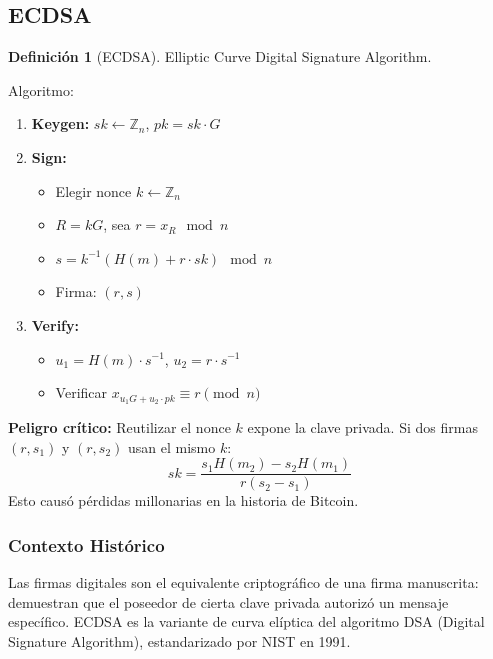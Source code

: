 \documentclass[11pt,a4paper,twoside,openright]{book}
\theoremstyle{definition}
\newtheorem{definition}{Definición}[chapter]
\theoremstyle{plain}
\theoremstyle{remark}
\newcommand{\Z}{\mathbb{Z}}
\begin{document}

\subsection{ECDSA}

\begin{definition}[ECDSA]
Elliptic Curve Digital Signature Algorithm.
\end{definition}

Algoritmo:
\begin{enumerate}
    \item \textbf{Keygen:} $sk \leftarrow \Z_n$, $pk = sk \cdot G$
    \item \textbf{Sign:}
    \begin{itemize}
        \item Elegir nonce $k \leftarrow \Z_n$
        \item $R = kG$, sea $r = x_R \mod n$
        \item $s = k^{-1}(H(m) + r \cdot sk) \mod n$
        \item Firma: $(r, s)$
    \end{itemize}
    \item \textbf{Verify:}
    \begin{itemize}
        \item $u_1 = H(m) \cdot s^{-1}$, $u_2 = r \cdot s^{-1}$
        \item Verificar $x_{u_1 G + u_2 \cdot pk} \equiv r \pmod{n}$
    \end{itemize}
\end{enumerate}

\begin{keyidea}
\textbf{Peligro crítico:} Reutilizar el nonce $k$ expone la clave privada.
Si dos firmas $(r, s_1)$ y $(r, s_2)$ usan el mismo $k$:
\[
sk = \frac{s_1 H(m_2) - s_2 H(m_1)}{r(s_2 - s_1)}
\]
Esto causó pérdidas millonarias en la historia de Bitcoin.
\end{keyidea}

\subsubsection{Contexto Histórico}

\begin{intuicion}
Las firmas digitales son el equivalente criptográfico de una firma manuscrita: demuestran que el poseedor de cierta clave privada autorizó un mensaje específico. ECDSA es la variante de curva elíptica del algoritmo DSA (Digital Signature Algorithm), estandarizado por NIST en 1991.
\end{intuicion}
\end{document}
